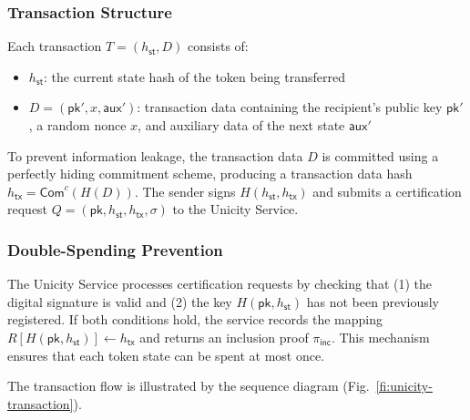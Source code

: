 \documentclass{article}
\newcommand{\pubkey}[0]{\mathsf{pk}}
\newcommand{\commitc}[0]{\mathsf{Com}^{c}}
\newcommand{\sthash}[0]{h_\mathsf{st}}
\newcommand{\txhash}[0]{h_\mathsf{tx}}
\newcommand{\auxd}[0]{\mathsf{aux}}
\newcommand{\pinc}[0]{\pi_{\mathsf{inc}}}
\begin{document}
\subsubsection{Transaction Structure}

Each transaction $T = (\sthash, D)$ consists of:
\begin{itemize}
\item $\sthash$: the current state hash of the token being transferred
\item $D = (\pubkey', x, \auxd')$: transaction data containing the recipient's public key $\pubkey'$, a random nonce $x$, and auxiliary data of the next state $\auxd'$
\end{itemize}

\noindent To prevent information leakage, the transaction data $D$ is committed using a perfectly hiding commitment scheme, producing a transaction data hash $\txhash = \commitc(H(D))$. The sender signs $H(\sthash, \txhash)$ and submits a certification request $Q = (\pubkey, \sthash, \txhash, \sigma)$ to the Unicity Service.

\subsubsection{Double-Spending Prevention}

The Unicity Service processes certification requests by checking that (1) the digital signature is valid and (2) the key $H(\pubkey, \sthash)$ has not been previously registered. If both conditions hold, the service records the mapping $R[H(\pubkey, \sthash)] \gets \txhash$ and returns an inclusion proof $\pinc$. This mechanism ensures that each token state can be spent at most once.

The transaction flow is illustrated by the sequence diagram (Fig.~\ref{fi:unicity-transaction}).
\end{document}
